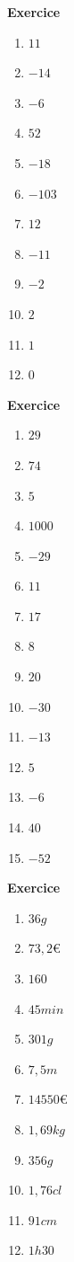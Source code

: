 \documentclass[10pt,a4paper]{article}
\newcounter{nexo}
\begin{document}
\textbf{Exercice \thenexo} 
\begin{multicols}{4}
	\begin{enumerate}[label=\alph*)]
		\item $11$
		\item $-14$
		\item $-6$
		\item $52$
		\item $-18$
		\item $-103$
		\item $12$
		\item $-11$
		\item $-2$
		\item $2$
		\item $1$
		\item $0$
	\end{enumerate}
\end{multicols}
\textbf{Exercice \thenexo} 
\begin{multicols}{4}
	\begin{enumerate}[label=\alph*)]
		\item $29$
		\item $74$
		\item $5$
		\item $1000$
		\item $-29$
		\item $11$
		\item $17$
		\item $8$
		\item $20$
		\item $-30$
		\item $-13$
		\item $5$
		\item $-6$
		\item $40$
		\item $-52$
	\end{enumerate}
\end{multicols}
\textbf{Exercice \thenexo} 
\begin{multicols}{4}
	\begin{enumerate}[label=\alph*)]
		\item $36g$
		\item $73,2$€
		\item $160$
		\item $45min$
		\item $301g$
		\item $7,5m$
		\item $14 550$€
		\item $1,69kg$
		\item $356g$
		\item $1,76cl$
		\item $91cm$
		\item $1h30$
	\end{enumerate}
\end{multicols}
\end{document}

